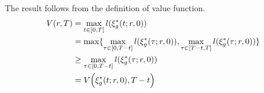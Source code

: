\begin{IEEEproof}
The result follows from the definition of value function.
  \begin{equation}
    \begin{aligned}
      V(r,T) & = \max_{t \in [0, T]} l(\xi_g^*(t; r, 0))\\
      & = \max\{ \max_{\tau \in [0, T-t]} l(\xi_g^*(\tau; r, 0)),\max_{\tau \in [T-t, T]} l(\xi_g^*(\tau; r, 0)) \}\\
      & \ge \max_{\tau \in [0, T-t]} l(\xi_g^*(\tau; r, 0))\\
      & = V\Big(\xi_g^*(t; r, 0), T - t \Big)
    \end{aligned}
  \end{equation}
\end{IEEEproof} 

